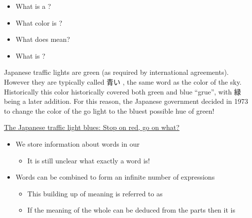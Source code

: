 \documentclass[a4paper,landscape,headrule,footrule,xetex,25pt]{foils}
\begin{document}

\begin{itemize}
\item What is a ?
\item What color is ?
\item What does  mean?
\item What is  ?
\end{itemize}

\newpage

Japanese traffic lights are green (as required by international
agreements).  However they are typically called 青い ,
the same word as the color of the sky.  Historically this color
historically covered both green and blue ``grue'',
with 緑  being a later addition.  For this reason,
the Japanese government decided in 1973 to change the color of the go
light to the bluest possible hue of green!


\href{https://www.japantimes.co.jp/life/2013/02/25/language/the-japanese-traffic-light-blues-stop-on-red-go-on-what/#.WRmAuuWGNPZ}{The Japanese traffic light blues: Stop on red, go on what?}
 


\begin{itemize}
\item We store information about words in our 
  \begin{itemize}
  \item It is still unclear what exactly a word is!
  \end{itemize}
\item Words can be combined to form an infinite number of expressions
  \begin{itemize}
  \item This building up of meaning is referred to as 
  \item If the meaning of the whole can be deduced from the parts then it is 
  \end{itemize}
\end{itemize}

\end{document}
